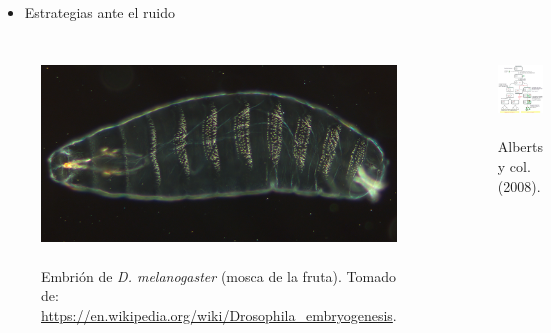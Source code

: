 \documentclass[xcolor=dvipsnames]{beamer}
\begin{document}
\begin{frame}
\begin{itemize}
\item Estrategias ante el ruido
\end{itemize}

\begin{columns}[c]


\begin{figure}[p]
    \centering
    \includegraphics[width=\textwidth]{drosophila}~\\
    \tiny Embri\'on de \textit{D. melanogaster} (mosca de la fruta). Tomado de: \url{https://en.wikipedia.org/wiki/Drosophila_embryogenesis}.
\end{figure}


\begin{figure}[p]
    \centering
    \includegraphics[width=.75\textwidth]{int-lambda}~\\
    \tiny Alberts y col. (2008).
\end{figure}
\end{columns}
\end{frame}
\end{document}
